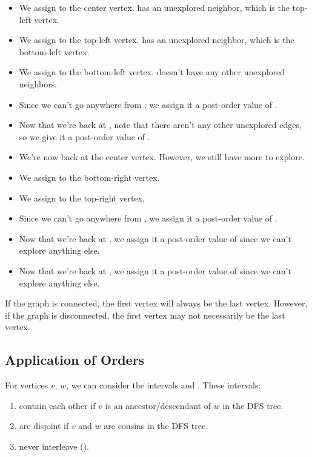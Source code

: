 \documentclass[letterpaper]{article}
\begin{document}
\begin{itemize}
    \item We assign  to the center vertex.  has an unexplored neighbor, which is the top-left vertex.
    \item We assign  to the top-left vertex.  has an unexplored neighbor, which is the bottom-left vertex. 
    \item We assign  to the bottom-left vertex.  doesn't have any other unexplored neighbors.  
    \item Since we can't go anywhere from , we assign it a post-order value of .
    \item Now that we're back at , note that there aren't any other unexplored edges, so we give it a post-order value of .
    \item We're now back at the center vertex. However, we still have more to explore.
    \item We assign  to the bottom-right vertex. 
    \item We assign  to the top-right vertex. 
    \item Since we can't go anywhere from , we assign it a post-order value of .
    \item Now that we're back at , we assign it a post-order value of  since we can't explore anything else.
    \item Now that we're back at , we assign it a post-order value of  since we can't explore anything else. 
\end{itemize}
If the graph is connected, the first vertex will always be the last vertex. However, if the graph is disconnected, the first vertex may not necessarily be the last vertex. 

\subsection{Application of Orders}
\begin{proposition}
    For vertices $v$, $w$, we can consider the intervals  and . These intervals:
    \begin{enumerate}
        \item contain each other if $v$ is an ancestor/descendant of $w$ in the DFS tree. 
        \item are disjoint if $v$ and $w$ are cousins in the DFS tree.
        \item never interleave ().
    \end{enumerate}
\end{proposition}
\end{document}
